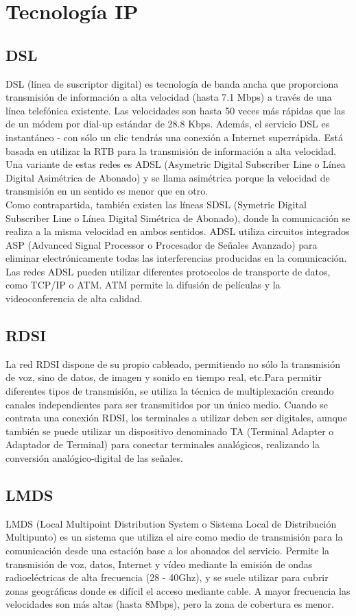 \documentclass[
	12pt, %
	fleqn, %
	a4paper, %
	oneside, %
]{LegrandOrangeBook}
\begin{document}
\section{Tecnología IP}
\subsection{DSL}
DSL (línea de suscriptor digital) es tecnología de banda ancha que proporciona transmisión de información a alta velocidad (hasta 7.1 Mbps) a través de una línea telefónica existente. Las velocidades son hasta 50 veces más rápidas que las de un módem por dial-up estándar de 28.8 Kbps. Además, el servicio DSL es instantáneo - con sólo un clic tendrás una conexión a Internet superrápida. Está basada en utilizar la RTB para la transmisión de información a alta velocidad.\\
Una variante de estas redes es ADSL (Asymetric Digital Subscriber Line o Línea Digital Asimétrica de Abonado) y se llama asimétrica porque la velocidad de transmisión en un sentido es menor que en otro.\\
Como contrapartida, también existen las líneas SDSL (Symetric Digital Subscriber Line o Línea Digital Simétrica de Abonado), donde la comunicación se realiza a la misma velocidad en ambos sentidos.
ADSL utiliza circuitos integrados ASP (Advanced Signal Processor o Procesador de Señales Avanzado) para eliminar electrónicamente todas las interferencias producidas en la comunicación. Las redes ADSL pueden utilizar diferentes protocolos de transporte de datos, como TCP/IP o ATM. ATM permite la difusión de películas y la videoconferencia de alta calidad.
\subsection{RDSI}
La red RDSI dispone de su propio cableado, permitiendo no sólo la transmisión de voz, sino de datos, de imagen y sonido en tiempo real, etc.Para permitir diferentes tipos de transmisión, se utiliza la técnica de multiplexación creando canales independientes para ser transmitidos por un único medio. Cuando se contrata una conexión RDSI, los terminales a utilizar deben ser digitales, aunque también se puede utilizar un dispositivo denominado TA (Terminal Adapter o Adaptador de Terminal) para conectar terminales analógicos, realizando la conversión analógico-digital de las señales.
\subsection{LMDS}
LMDS (Local Multipoint Distribution System o Sistema Local de Distribución Multipunto) es un sistema que utiliza el aire como medio de transmisión para la comunicación desde una estación base a los abonados del servicio. Permite la transmisión de voz, datos, Internet y vídeo mediante la emisión de ondas radioeléctricas de alta frecuencia (28 - 40Ghz), y se suele utilizar para cubrir zonas geográficas donde es difícil el acceso mediante cable. A mayor frecuencia las velocidades son más altas (hasta 8Mbps), pero la zona de cobertura es menor.
\end{document}
